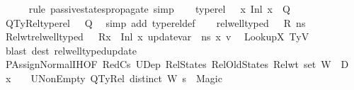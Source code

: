 \begin{isabellebody}
\ \ \ \ \isamarkupfalse%
\ {\isacharparenleft}{\kern0pt}rule\ passive{\isacharunderscore}{\kern0pt}states{\isacharunderscore}{\kern0pt}propagate{\isacharunderscore}{\kern0pt}{}{\isacharparenright}{\kern0pt}\ simp\isanewline
\ \ \isamarkupfalse%
\ {\isacartoucheopen}type{\isacharunderscore}{\kern0pt}rel\ {\isasymLambda}\ {\isasymLambda}{\isacharprime}{\kern0pt}\ {\isacharparenleft}{\kern0pt}{\isacharparenleft}{\kern0pt}x{}{\isacharcomma}{\kern0pt}\ {\isacharparenleft}{\kern0pt}Inl\ x{}{\isacharparenright}{\kern0pt}{\isacharparenright}{\kern0pt}\ {\isacharhash}{\kern0pt}\ Q{\isacharparenright}{\kern0pt}{\isacartoucheclose}\ \isamarkupfalse%
\ QTyRel{\isacharcolon}{\kern0pt}{\isachardoublequoteopen}type{\isacharunderscore}{\kern0pt}rel\ {\isasymLambda}\ {\isasymLambda}{\isacharprime}{\kern0pt}\ Q{\isachardoublequoteclose}\ \isamarkupfalse%
\ {\isacharparenleft}{\kern0pt}simp\ add{\isacharcolon}{\kern0pt}\ type{\isacharunderscore}{\kern0pt}rel{\isacharunderscore}{\kern0pt}def{\isacharparenright}{\kern0pt}\isanewline
\ \ \isamarkupfalse%
\ {\isacartoucheopen}rel{\isacharunderscore}{\kern0pt}well{\isacharunderscore}{\kern0pt}typed\ {\isasymLambda}\ {\isasymOmega}\ R\ ns{\isacartoucheclose}\ \isamarkupfalse%
\ Rel{\isacharunderscore}{\kern0pt}wt{\isacharcolon}{\kern0pt}{\isacartoucheopen}rel{\isacharunderscore}{\kern0pt}well{\isacharunderscore}{\kern0pt}typed\ {\isasymLambda}\ {\isasymOmega}\ {\isacharparenleft}{\kern0pt}R{\isacharparenleft}{\kern0pt}x{}\ {\isasymmapsto}\ {\isacharparenleft}{\kern0pt}Inl\ x{}{\isacharparenright}{\kern0pt}{\isacharparenright}{\kern0pt}{\isacharparenright}{\kern0pt}\ {\isacharparenleft}{\kern0pt}update{\isacharunderscore}{\kern0pt}var\ {\isasymLambda}\ ns\ x{}\ v{}{\isacharparenright}{\kern0pt}{\isacartoucheclose}\ \isamarkupfalse%
\ LookupX{}\ TyV{}\ \ \ \ \isanewline
\ \ \ \ \isamarkupfalse%
\ {\isacharparenleft}{\kern0pt}blast\ dest{\isacharcolon}{\kern0pt}\ rel{\isacharunderscore}{\kern0pt}well{\isacharunderscore}{\kern0pt}typed{\isacharunderscore}{\kern0pt}update{\isacharparenright}{\kern0pt}\isanewline
\ \ \isamarkupfalse%
\ PAssignNormal{\isachardot}{\kern0pt}IH{\isacharbrackleft}{\kern0pt}OF\ RedCs{}\ U{}Dep\ RelStates\ RelOldStates\ Rel{\isacharunderscore}{\kern0pt}wt\ {\isacartoucheopen}set\ W\ {\isasyminter}\ {\isacharparenleft}{\kern0pt}D{}\ {\isasymunion}\ {\isacharbraceleft}{\kern0pt}x{}{\isacharbraceright}{\kern0pt}{\isacharparenright}{\kern0pt}\ {\isacharequal}{\kern0pt}\ {\isacharbraceleft}{\kern0pt}{\isacharbraceright}{\kern0pt}{\isacartoucheclose}\ \ U{}NonEmpty\ QTyRel\ {\isacartoucheopen}distinct\ W{\isacartoucheclose}\ {\isacartoucheopen}s{\isacharprime}{\kern0pt}\ {\isasymnoteq}\ Magic{\isacartoucheclose}{\isacharbrackright}{\kern0pt}\ \isamarkupfalse%

\end{isabellebody}
